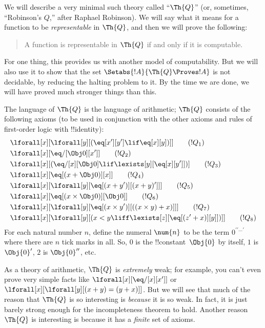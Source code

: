 \documentclass[../../../include/open-logic-section]{subfiles}
\begin{document}

We will describe a very minimal such theory called ``$\Th{Q}$'' (or,
sometimes, ``Robinson's $Q$,'' after Raphael Robinson). We will say
what it means for a function to be \emph{representable} in $\Th{Q}$, and
then we will prove the following:
\begin{quote}
  A function is representable in $\Th{Q}$ if and only if it is computable.
\end{quote}
For one thing, this provides us with another model of
computability. But we will also use it to show that the set
$\Setabs{!A}{\Th{Q} \Proves !A}$ is not decidable, by reducing the
halting problem to it. By the time we are done, we will have proved
much stronger things than this.

The language of $\Th{Q}$ is the language of
arithmetic; $\Th{Q}$ consists of the following axioms
(to be used in conjunction with the other axioms and rules of
first-order logic with !!{identity}):
\begin{align*}
& \lforall[x][\lforall[y][(\eq[x'][y'] \lif \eq[x][y])]] \tag{$!Q_1$}\\
& \lforall[x][\eq/[\Obj 0][x']] \tag{$!Q_2$}\\
& \lforall[x][(\eq/[x][\Obj 0] \lif \lexists[y][\eq[x][y']])] \tag{$!Q_3$}\\
& \lforall[x][\eq[(x + \Obj 0)][x]] \tag{$!Q_4$}\\
& \lforall[x][\lforall[y][\eq[(x + y')][(x + y)']]] \tag{$!Q_5$}\\
& \lforall[x][\eq[(x \times \Obj 0)][\Obj 0]] \tag{$!Q_6$}\\
& \lforall[x][\lforall[y][\eq[(x \times y')][((x \times y) + x)]]] \tag{$!Q_7$}\\
& \lforall[x][\lforall[y][(x < y \liff \lexists[z][\eq[(z' + x)][y]])]] \tag{$!Q_8$}
\end{align*}
For each natural number $n$, define the numeral $\num{n}$ to be the
term $0^{\prime\prime\ldots\prime}$ where there are $n$ tick marks in
all.  So, $\num{0}$ is the !!{constant}~$\Obj{0}$ by itself, $\num{1}$
is $\Obj{0}'$, $\num{2}$ is $\Obj{0}''$, etc.

As a theory of arithmetic, $\Th{Q}$ is \emph{extremely} weak; for
example, you can't even prove very simple facts like
$\lforall[x][\eq/[x][x']]$ or $\lforall[x][\lforall[y][(x + y) = (y +
    x)]]$. But we will see that much of the reason that $\Th{Q}$ is so
interesting is \emph{because} it is so weak. In fact, it is just
barely strong enough for the incompleteness theorem to hold. Another
reason $\Th{Q}$ is interesting is because it has a \emph{finite} set
of axioms.
\end{document}
